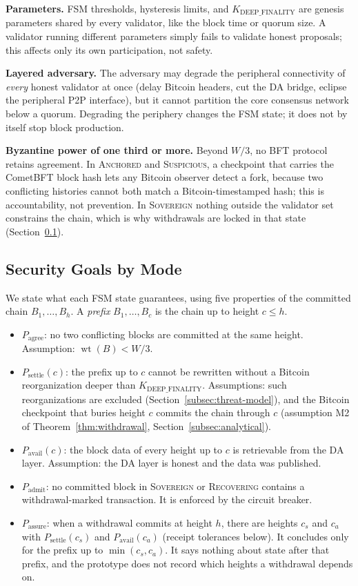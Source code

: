 \textbf{Parameters.} FSM thresholds, hysteresis limits, and
$K_{\text{DEEP\_FINALITY}}$ are genesis parameters shared by every validator,
like the block time or quorum size. A validator running different parameters
simply fails to validate honest proposals; this affects only its own
participation, not safety.

\textbf{Layered adversary.} The adversary may degrade the peripheral
connectivity of \emph{every} honest validator at once (delay Bitcoin
headers, cut the DA bridge, eclipse the peripheral P2P interface), but it
cannot partition the core consensus network below a quorum. Degrading the
periphery changes the FSM state; it does not by itself stop block production.

\textbf{Byzantine power of one third or more.} Beyond $W/3$, no BFT protocol
retains agreement. In \textsc{Anchored} and \textsc{Suspicious}, a
checkpoint that carries the CometBFT block hash lets any Bitcoin observer
detect a fork, because two conflicting histories cannot both match a
Bitcoin-timestamped hash; this is accountability, not prevention. In
\textsc{Sovereign} nothing outside the validator set constrains the chain,
which is why withdrawals are locked in that state
(Section~\ref{subsec:security-semantics}).

\subsection{Security Goals by Mode}
\label{subsec:security-semantics}

We state what each FSM state guarantees, using five properties of the
committed chain $B_1, \dots, B_h$. A \emph{prefix} $B_1, \dots, B_c$ is the
chain up to height $c \leq h$.
\begin{itemize}
  \item $P_{\text{agree}}$: no two conflicting blocks are committed at the
  same height. Assumption: $\operatorname{wt}(B) < W/3$.
  \item $P_{\text{settle}}(c)$: the prefix up to $c$ cannot be rewritten
  without a Bitcoin reorganization deeper than $K_{\text{DEEP\_FINALITY}}$.
  Assumptions: such reorganizations are excluded
  (Section~\ref{subsec:threat-model}), and the Bitcoin checkpoint that
  buries height $c$ commits the chain through $c$ (assumption M2 of
  Theorem~\ref{thm:withdrawal}, Section~\ref{subsec:analytical}).
  \item $P_{\text{avail}}(c)$: the block data of every height up to $c$ is
  retrievable from the DA layer. Assumption: the DA layer is honest and the
  data was published.
  \item $P_{\text{admit}}$: no committed block in \textsc{Sovereign} or
  \textsc{Recovering} contains a withdrawal-marked transaction. It is enforced
  by the circuit breaker.
  \item $P_{\text{assure}}$: when a withdrawal commits at height $h$, there
  are heights $c_s$ and $c_a$ with $P_{\text{settle}}(c_s)$ and
  $P_{\text{avail}}(c_a)$ (receipt tolerances below). It concludes only for the
  prefix up to $\min(c_s, c_a)$. It says nothing about state after that
  prefix, and the prototype does not record which heights a withdrawal depends on.
\end{itemize}


